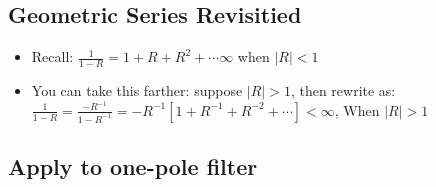 \subsection*{Geometric Series Revisitied}
\begin{itemize}
\item{Recall: 
$\frac{1}{1-R} = 1 + R + R^2 + \cdots \infty $ when $\vert R \vert < 1$
}
\item{
You can take this farther: suppose $\vert R \vert > 1$, then rewrite as:\\
$\frac{1}{1 - R} = \frac{-R^{-1}}{1 - R^{-1}} =
-R^{-1} [1 + R^{-1} + R^{-2} + \cdots ] < \infty
$, When $\vert R \vert > 1$
}
\end{itemize}
\subsection*{Apply to one-pole filter}
